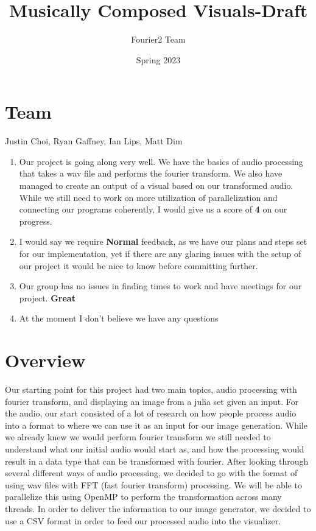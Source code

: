 \documentclass{article}
\title{Musically Composed Visuals-Draft}
\author{Fourier2 Team}
\date{Spring 2023}
\begin{document}
\maketitle

\section{Team}
Justin Choi, Ryan Gaffney, Ian Lips, Matt Dim

\begin{enumerate}
\item Our project is going along very well. We have the basics of audio processing that takes a wav file and performs the fourier transform. We also have managed to create an output of a visual based on our transformed audio. While we still need to work on more utilization of parallelization and connecting our programs coherently, I would give us a score of \textbf{4} on our progress.
\item I would say we require \textbf{Normal} feedback, as we have our plans and steps set for our implementation, yet if there are any glaring issues with the setup of our project it would be nice to know before committing further.
\item Our group has no issues in finding times to work and have meetings for our project. \textbf{Great}
\item At the moment I don’t believe we have any questions
\end{enumerate}

\section{Overview}
\par Our starting point for this project had two main topics, audio processing with fourier transform, and displaying an image from a julia set given an input. For the audio, our start consisted of a lot of research on how people process audio into a format to where we can use it as an input for our image generation. While we already knew we would perform fourier transform we still needed to understand what our initial audio would start as, and how the processing would result in a data type that can be transformed with fourier. After looking through several different ways of audio processing, we decided to go with the format of using wav files with FFT (fast fourier transform) processing. We will be able to parallelize this using OpenMP to perform the transformation across many threads. In order to deliver the information to our image generator, we decided to use a CSV format in order to feed our processed audio into the visualizer.
\end{document}
